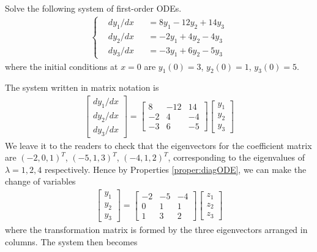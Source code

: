 \begin{exmp}
Solve the following system of first-order ODEs.
\begin{align*}
\left\{\begin{alignedat}{2}
& dy_1/dx & &= 8y_1 - 12y_2 + 14y_3 \\
& dy_2/dx & &= -2y_1 + 4y_2 - 4y_3 \\
& dy_3/dx & &= -3y_1 + 6y_2 - 5y_3 
\end{alignedat}\right.    
\end{align*}
where the initial conditions at $x=0$ are $y_1(0) = 3$, $y_2(0) = 1$, $y_3(0) = 5$.
\end{exmp}
\begin{solution}
The system written in matrix notation is
\begin{align*}
\begin{bmatrix}
dy_1/dx \\
dy_2/dx \\
dy_3/dx
\end{bmatrix}
=
\begin{bmatrix}
8 & -12 & 14 \\
-2 & 4 & -4 \\
-3 & 6 & -5
\end{bmatrix}
\begin{bmatrix}
y_1 \\
y_2 \\
y_3
\end{bmatrix}
\end{align*}
We leave it to the readers to check that the eigenvectors for the coefficient matrix are $(-2,0,1)^T$, $(-5,1,3)^T$, $(-4,1,2)^T$, corresponding to the eigenvalues of $\lambda = 1, 2, 4$ respectively. Hence by Properties \ref{proper:diagODE}, we can make the change of variables
\begin{align*}
\begin{bmatrix}
y_1 \\
y_2 \\
y_3
\end{bmatrix}
=
\begin{bmatrix}
-2 & -5 & -4 \\
0 & 1 & 1 \\
1 & 3 & 2
\end{bmatrix}
\begin{bmatrix}
z_1 \\
z_2 \\
z_3
\end{bmatrix}
\end{align*}
where the transformation matrix is formed by the three eigenvectors arranged in columns. The system then becomes

\end{solution}
